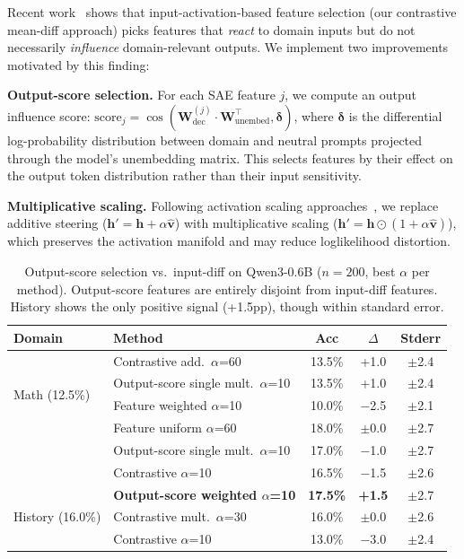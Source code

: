 \documentclass[11pt,a4paper]{article}
\begin{document}
Recent work~\cite{acharya2025output} shows that input-activation-based feature selection (our contrastive mean-diff approach) picks features that \textit{react} to domain inputs but do not necessarily \textit{influence} domain-relevant outputs. We implement two improvements motivated by this finding:

\textbf{Output-score selection.} For each SAE feature $j$, we compute an output influence score: $\text{score}_j = \cos(\mathbf{W}_{\text{dec}}^{(j)} \cdot \mathbf{W}_{\text{unembed}}^\top, \boldsymbol{\delta})$, where $\boldsymbol{\delta}$ is the differential log-probability distribution between domain and neutral prompts projected through the model's unembedding matrix. This selects features by their effect on the output token distribution rather than their input sensitivity.

\textbf{Multiplicative scaling.} Following activation scaling approaches~\cite{stoehr2024scaling}, we replace additive steering ($\mathbf{h}' = \mathbf{h} + \alpha \hat{\mathbf{v}}$) with multiplicative scaling ($\mathbf{h}' = \mathbf{h} \odot (1 + \alpha \hat{\mathbf{v}})$), which preserves the activation manifold and may reduce loglikelihood distortion.

\begin{table}[H]
\centering
\caption{Output-score selection vs.\ input-diff on Qwen3-0.6B ($n=200$, best $\alpha$ per method). Output-score features are entirely disjoint from input-diff features. History shows the only positive signal (+1.5pp), though within standard error.}
\label{tab:output_score}
\small
\begin{tabular}{llccc}
\toprule
\textbf{Domain} & \textbf{Method} & \textbf{Acc} & \textbf{$\Delta$} & \textbf{Stderr} \\
\midrule
\multirow{4}{*}{Math (12.5\%)}
  & Contrastive add.\ $\alpha$=60   & 13.5\% & +1.0 & $\pm$2.4 \\
  & Output-score single mult.\ $\alpha$=10 & 13.5\% & +1.0 & $\pm$2.4 \\
  & Feature weighted $\alpha$=10    & 10.0\% & $-$2.5 & $\pm$2.1 \\
\midrule
\multirow{4}{*}{Law (18.0\%)}
  & Feature uniform $\alpha$=60     & 18.0\% & $\pm$0.0 & $\pm$2.7 \\
  & Output-score single mult.\ $\alpha$=10 & 17.0\% & $-$1.0 & $\pm$2.7 \\
  & Contrastive $\alpha$=10         & 16.5\% & $-$1.5 & $\pm$2.6 \\
\midrule
\multirow{4}{*}{History (16.0\%)}
  & \textbf{Output-score weighted $\alpha$=10} & \textbf{17.5\%} & \textbf{+1.5} & $\pm$2.7 \\
  & Contrastive mult.\ $\alpha$=30  & 16.0\% & $\pm$0.0 & $\pm$2.6 \\
  & Contrastive $\alpha$=10         & 13.0\% & $-$3.0 & $\pm$2.4 \\
\bottomrule
\end{tabular}
\end{table}
\end{document}
